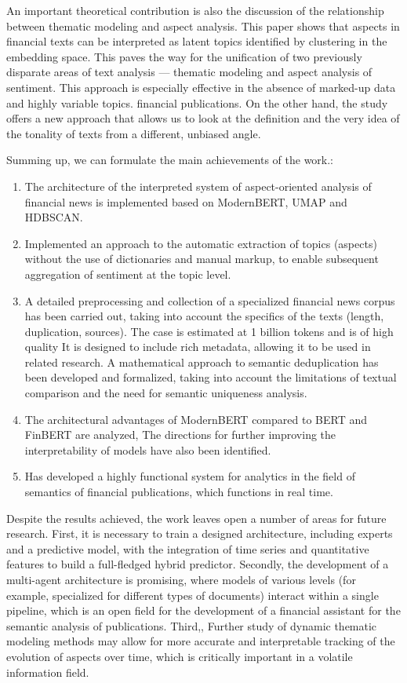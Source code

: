 An important theoretical contribution is also the discussion of the relationship between thematic modeling and aspect
analysis. This paper shows that aspects in financial texts can be interpreted as latent
topics identified by clustering in the embedding space. This paves the way for the unification of two
previously disparate areas of text analysis — thematic modeling and aspect analysis of sentiment.
This approach is especially effective in the absence of marked-up data and highly variable topics.
financial publications. On the other hand, the study offers a new approach that allows us to look
at the definition and the very idea of the tonality of texts from a different, unbiased angle.

Summing up, we can formulate the main achievements of the work.:

\begin{enumerate}
    \item The architecture of the interpreted system of aspect-oriented analysis of financial news is implemented
    based on ModernBERT, UMAP and HDBSCAN.
    \item Implemented an approach to the automatic extraction of topics (aspects) without the use of dictionaries and manual markup,
    to enable subsequent aggregation of sentiment at the topic level.
    \item A detailed preprocessing and collection of a specialized financial news corpus has been carried out, taking into account
the specifics of the texts (length, duplication, sources). The case is estimated at 1 billion tokens and is of high quality
    It is designed to include rich metadata, allowing it to be used in related research.
    A mathematical approach to semantic deduplication has been developed and formalized, taking into account the limitations of
    textual comparison and the need for semantic uniqueness analysis.
    \item The architectural advantages of ModernBERT compared to BERT and FinBERT are analyzed,
    The directions for further improving the interpretability of models have also been identified.
    \item Has developed a highly functional system for analytics in the field of semantics of financial publications,
    which functions in real time.
\end{enumerate}

Despite the results achieved, the work leaves open a number of areas for future research.
First, it is necessary to train a designed architecture, including experts and a predictive model,
with the integration of time series and quantitative features to build a full-fledged hybrid predictor.
Secondly, the development of a multi-agent architecture is promising, where models of various levels (for example,
specialized for different types of documents) interact within a single pipeline, which is
an open field for the development of a financial assistant for the semantic analysis of publications. Third,,
Further study of dynamic thematic modeling methods may allow for more accurate
and interpretable tracking of the evolution of aspects over time, which is critically important in a volatile
information field.

